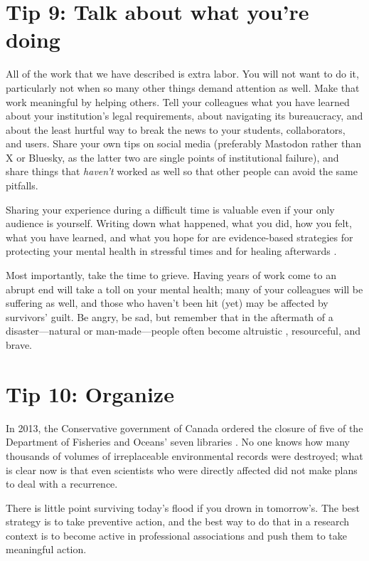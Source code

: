 \documentclass[10pt,letterpaper]{article}
\begin{document}
\section*{Tip 9: Talk about what you're doing}

All of the work that we have described is extra labor.
You will not want to do it,
particularly not when so many other things demand attention as well.
Make that work meaningful by helping others.
Tell your colleagues what you have learned about your institution's legal requirements,
about navigating its bureaucracy,
and about the least hurtful way to break the news to your students, collaborators, and users.
Share your own tips on social media
(preferably Mastodon rather than X or Bluesky,
as the latter two are single points of institutional failure),
and share things that \emph{haven't} worked as well
so that other people can avoid the same pitfalls.

Sharing your experience during a difficult time is valuable even if your only audience is yourself.
Writing down what happened, what you did, how you felt, what you have learned, and what you hope for
are evidence-based strategies for protecting your mental health in stressful times
and for healing afterwards \cite{Pennebaker2016,Cullen2022}.

Most importantly,
take the time to grieve.
Having years of work come to an abrupt end will take a toll on your mental health;
many of your colleagues will be suffering as well,
and those who haven't been hit (yet) may be affected by survivors' guilt.
Be angry,
be sad,
but remember that in the aftermath of a disaster---natural or man-made---people
often become altruistic \cite{Yang2024}, resourceful, and brave.

\section*{Tip 10: Organize}

In 2013,
the Conservative government of Canada ordered the closure of
five of the Department of Fisheries and Oceans' seven libraries \cite{Nikiforuk2013}.
No one knows how many thousands of volumes of irreplaceable environmental records were destroyed;
what is clear now is that even scientists who were directly affected
did not make plans to deal with a recurrence.

There is little point surviving today's flood if you drown in tomorrow's.
The best strategy is to take preventive action,
and the best way to do that in a research context
is to become active in professional associations
and push them to take meaningful action.
\end{document}
